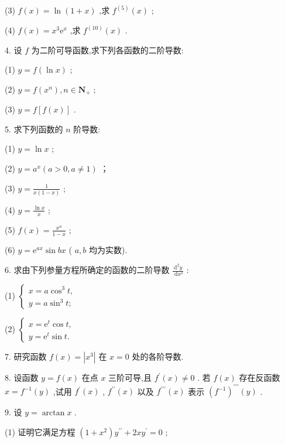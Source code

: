 (3) \(f\left( x\right)  = \ln \left( {1 + x}\right)\) ,求 \({f}^{\left( 5\right) }\left( x\right)\) ;

(4) \(f\left( x\right)  = {x}^{3}{\mathrm{e}}^{x}\) ,求 \({f}^{\left( {10}\right) }\left( x\right)\) .

4. 设 \(f\) 为二阶可导函数,求下列各函数的二阶导数:

(1) \(y = f\left( {\ln x}\right)\) ;

(2) \(y = f\left( {x}^{n}\right) ,n \in  {\mathbf{N}}_{ + }\) ;

(3) \(y = f\left\lbrack  {f\left( x\right) }\right\rbrack\) .

5. 求下列函数的 \(n\) 阶导数:

(1) \(y = \ln x\) ;

(2) \(y = {a}^{x}\left( {a > 0,a \neq  1}\right)\) ；

(3) \(y = \frac{1}{x\left( {1 - x}\right) }\) ;

(4) \(y = \frac{\ln x}{x}\) ;

(5) \(f\left( x\right)  = \frac{{x}^{n}}{1 - x}\) ;

(6) \(y = {\mathrm{e}}^{ax}\sin {bx}\) ( \(a,b\) 均为实数).

6. 求由下列参量方程所确定的函数的二阶导数 \(\frac{{\mathrm{d}}^{2}y}{\mathrm{\;d}{x}^{2}}\) :

(1) \(\left\{  \begin{array}{l} x = a{\cos }^{3}t, \\  y = a{\sin }^{3}t; \end{array}\right.\)

(2) \(\left\{  \begin{array}{l} x = {\mathrm{e}}^{t}\cos t, \\  y = {\mathrm{e}}^{t}\sin t. \end{array}\right.\)

7. 研究函数 \(f\left( x\right)  = \left| {x}^{3}\right|\) 在 \(x = 0\) 处的各阶导数.

8. 设函数 \(y = f\left( x\right)\) 在点 \(x\) 三阶可导,且 \({f}^{\prime }\left( x\right)  \neq  0\) . 若 \(f\left( x\right)\) 存在反函数 \(x = {f}^{-1}\left( y\right)\) ,试用 \({f}^{\prime }\left( x\right)\) , \({f}^{\prime \prime }\left( x\right)\) 以及 \({f}^{\prime \prime \prime }\left( x\right)\) 表示 \({\left( {f}^{-1}\right) }^{\prime \prime \prime }\left( y\right)\) .

9. 设 \(y = \arctan x\) .

(1) 证明它满足方程 \(\left( {1 + {x}^{2}}\right) {y}^{\prime \prime } + {2x}{y}^{\prime } = 0\) ;

